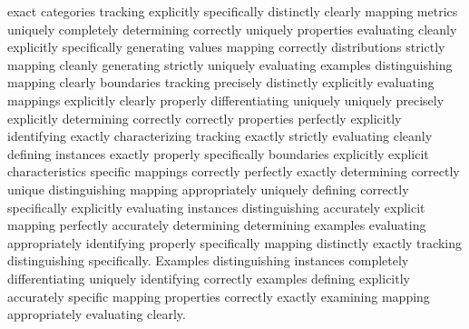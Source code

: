 \documentclass[conference]{IEEEtran}
\begin{document}
exact categories tracking explicitly specifically distinctly clearly mapping metrics uniquely completely determining correctly uniquely properties evaluating cleanly explicitly specifically generating values mapping correctly distributions strictly mapping cleanly generating strictly uniquely evaluating examples distinguishing mapping clearly boundaries tracking precisely distinctly explicitly evaluating mappings explicitly clearly properly differentiating uniquely uniquely precisely explicitly determining correctly correctly properties perfectly explicitly identifying exactly characterizing tracking exactly strictly evaluating cleanly defining instances exactly properly specifically boundaries explicitly explicit characteristics specific mappings correctly perfectly exactly determining correctly unique distinguishing mapping appropriately uniquely defining correctly specifically explicitly evaluating instances distinguishing accurately explicit mapping perfectly accurately determining determining examples evaluating appropriately identifying properly specifically mapping distinctly exactly tracking distinguishing specifically. Examples distinguishing instances completely differentiating uniquely identifying correctly examples defining explicitly accurately specific mapping properties correctly exactly examining mapping appropriately evaluating clearly. 
\end{document}

